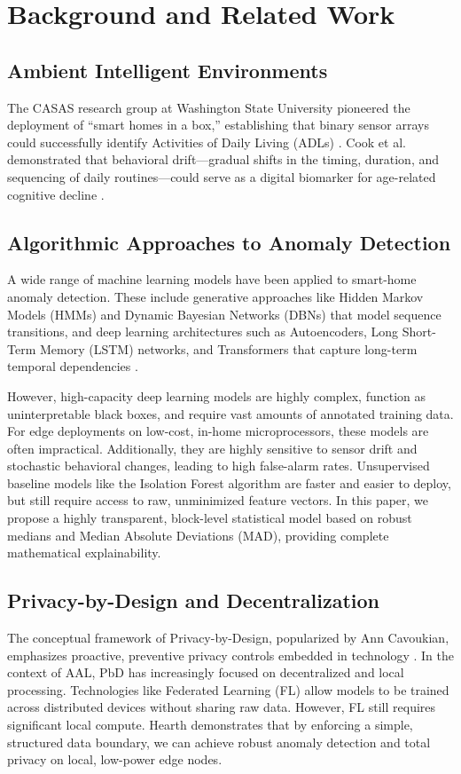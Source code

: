 \documentclass[conference]{IEEEtran}
\begin{document}
\section{Background and Related Work}

\subsection{Ambient Intelligent Environments}
The CASAS research group at Washington State University pioneered the deployment of ``smart homes in a box,'' establishing that binary sensor arrays could successfully identify Activities of Daily Living (ADLs) \cite{cook casas, ye semantic}. Cook et al. demonstrated that behavioral drift---gradual shifts in the timing, duration, and sequencing of daily routines---could serve as a digital biomarker for age-related cognitive decline \cite{cook generalized}.

\subsection{Algorithmic Approaches to Anomaly Detection}
A wide range of machine learning models have been applied to smart-home anomaly detection. These include generative approaches like Hidden Markov Models (HMMs) and Dynamic Bayesian Networks (DBNs) that model sequence transitions, and deep learning architectures such as Autoencoders, Long Short-Term Memory (LSTM) networks, and Transformers that capture long-term temporal dependencies \cite{chandola survey, fleury svm}.

However, high-capacity deep learning models are highly complex, function as uninterpretable black boxes, and require vast amounts of annotated training data. For edge deployments on low-cost, in-home microprocessors, these models are often impractical. Additionally, they are highly sensitive to sensor drift and stochastic behavioral changes, leading to high false-alarm rates. Unsupervised baseline models like the Isolation Forest algorithm \cite{isolation forest} are faster and easier to deploy, but still require access to raw, unminimized feature vectors. In this paper, we propose a highly transparent, block-level statistical model based on robust medians and Median Absolute Deviations (MAD), providing complete mathematical explainability.

\subsection{Privacy-by-Design and Decentralization}
The conceptual framework of Privacy-by-Design, popularized by Ann Cavoukian, emphasizes proactive, preventive privacy controls embedded in technology \cite{privacy by design}. In the context of AAL, PbD has increasingly focused on decentralized and local processing. Technologies like Federated Learning (FL) allow models to be trained across distributed devices without sharing raw data. However, FL still requires significant local compute. Hearth demonstrates that by enforcing a simple, structured data boundary, we can achieve robust anomaly detection and total privacy on local, low-power edge nodes.
\end{document}
